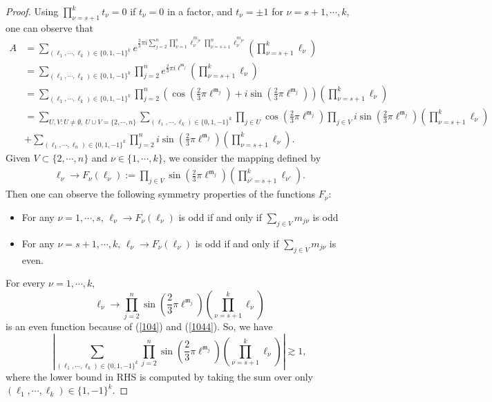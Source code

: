 \documentclass[11 pt,letterpaper]{amsart}
\theoremstyle{plain}
\theoremstyle{definition}
\theoremstyle{remark} \theoremstyle{exam} \theoremstyle{ob}
\numberwithin{equation}{section}
\begin{document}
\begin{proof}
Using $\prod_{\nu=s+1}^k t_{\nu}=0$ if $t_\nu=0$ in a factor, and $t_{\nu}=\pm 1 $ for $\nu=s+1,\cdots,k$, one can observe that
\begin{align*}
A& =  \sum_{(\ell_1,\cdots,\ell_k)\in\{0,1,-1\}^k} e^{\frac{2}{3}\pi i 
 \sum_{j=2}^n \prod_{\nu=1}^s \ell_\nu^{m_{j\nu}} \prod_{\nu=s+1}^n \ell_\nu^{m_{j\nu}}  }\left(\prod_{\nu=s+1}^k \ell_{\nu}\right) \\
& =  \sum_{(\ell_1,\cdots,\ell_k)\in\{0,1,-1\}^k} \prod_{j=2}^n e^{\frac{2}{3}\pi i 
  \ell^{\mathfrak{m}_j}   }\left(\prod_{\nu=s+1}^k \ell_{\nu}\right)\\
& =  \sum_{(\ell_1,\cdots,\ell_k)\in\{0,1,-1\}^k} \prod_{j=2}^n\left( \cos \left(\frac{2}{3}\pi 
  \ell^{\mathfrak{m}_j}\right)+i  \sin \left(\frac{2}{3}\pi 
  \ell^{\mathfrak{m}_j}\right)\right)\left(\prod_{\nu=s+1}^k \ell_{\nu}\right)\\
&=\sum_{U,V: U\ne\emptyset, \ U\cup V=\{2,\cdots,n\}}\sum_{(\ell_1,\cdots,\ell_k)\in\{0,1,-1\}^k}  \prod_{j\in U} \cos \left(\frac{2}{3}\pi 
  \ell^{\mathfrak{m}_j}\right)\prod_{j\in V}i \sin \left(\frac{2}{3}\pi 
  \ell^{\mathfrak{m}_j}\right)\left(\prod_{\nu=s+1}^k \ell_{\nu}\right)\\
  &+\sum_{(\ell_1,\cdots,\ell_n)\in\{0,1,-1\}^k}  \prod_{j=2}^ni \sin \left(\frac{2}{3}\pi 
  \ell^{\mathfrak{m}_j}\right)\left(\prod_{\nu=s+1}^k\ell_{\nu}\right).
\end{align*}
Given $V\subset\{2,\cdots,n\}$ and $\nu\in\{1,\cdots,k\}$,  we consider the mapping defined by
\begin{align}
\ell_\nu\rightarrow F_\nu(\ell_\nu):=\prod_{j\in V} \sin \left(\frac{2}{3}\pi 
  \ell^{\mathfrak{m}_j}\right)\left(\prod_{\nu'=s+1}^k \ell_{\nu'}\right).
\end{align}
Then one can observe the following symmetry properties of the functions $F_\nu$:
\begin{itemize}
\item For any  $\nu=1,\cdots,s$,
$\ell_\nu\rightarrow F_\nu(\ell_\nu)$ is  odd  if and only if $\sum_{j\in V} m_{j\nu}$ is odd
\item For any  $\nu=s+1,\cdots,k$,
$\ell_\nu\rightarrow F_\nu(\ell_\nu)$ is odd if and only  if $\sum_{j\in V}m_{j\nu}$ is even.
\end{itemize}
For every $\nu=1,\cdots,k$,
$$\ell_\nu\rightarrow  \prod_{j=2}^n \sin \left(\frac{2}{3}\pi 
  \ell^{\mathfrak{m}_j}\right)\left(\prod_{\nu=s+1}^k \ell_{\nu}\right)$$ is an even function  because of (\ref{104}) and (\ref{1044}). So,  we have
$$\left|\sum_{(\ell_1,\cdots,\ell_k)\in\{0,1,-1\}^k} \prod_{j=2}^n \sin \left(\frac{2}{3}\pi 
  \ell^{\mathfrak{m}_j}\right)\left(\prod_{\nu=s+1}^k \ell_{\nu}\right)\right|\gtrsim 1,$$
where the lower bound in RHS is computed by taking the sum over only $(\ell_1,\cdots,\ell_k)\in \{1,-1\}^k$.


\end{proof}
\end{document}
